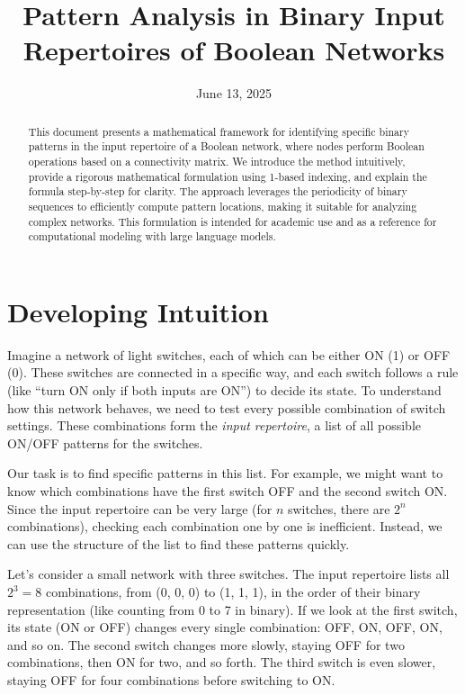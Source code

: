 \documentclass[12pt]{article}
\title{Pattern Analysis in Binary Input Repertoires of Boolean Networks}
\author{}
\date{June 13, 2025}
\begin{document}
\maketitle

\begin{abstract}
This document presents a mathematical framework for identifying specific binary patterns in the input repertoire of a Boolean network, where nodes perform Boolean operations based on a connectivity matrix. We introduce the method intuitively, provide a rigorous mathematical formulation using 1-based indexing, and explain the formula step-by-step for clarity. The approach leverages the periodicity of binary sequences to efficiently compute pattern locations, making it suitable for analyzing complex networks. This formulation is intended for academic use and as a reference for computational modeling with large language models.
\end{abstract}

\section{Developing Intuition}
Imagine a network of light switches, each of which can be either ON (1) or OFF (0). These switches are connected in a specific way, and each switch follows a rule (like ``turn ON only if both inputs are ON'') to decide its state. To understand how this network behaves, we need to test every possible combination of switch settings. These combinations form the \textit{input repertoire}, a list of all possible ON/OFF patterns for the switches.

Our task is to find specific patterns in this list. For example, we might want to know which combinations have the first switch OFF and the second switch ON. Since the input repertoire can be very large (for \( n \) switches, there are \( 2^n \) combinations), checking each combination one by one is inefficient. Instead, we can use the structure of the list to find these patterns quickly.

Let’s consider a small network with three switches. The input repertoire lists all \( 2^3 = 8 \) combinations, from (0, 0, 0) to (1, 1, 1), in the order of their binary representation (like counting from 0 to 7 in binary). If we look at the first switch, its state (ON or OFF) changes every single combination: OFF, ON, OFF, ON, and so on. The second switch changes more slowly, staying OFF for two combinations, then ON for two, and so forth. The third switch is even slower, staying OFF for four combinations before switching to ON.
\end{document}
